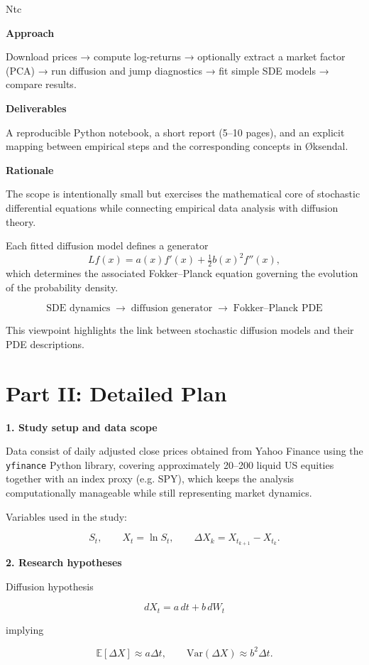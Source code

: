 Ntc\documentclass[11pt]{article}
\begin{document}
	\textbf{Approach}
	
	Download prices → compute log-returns → optionally extract a market factor (PCA) → run diffusion and jump diagnostics → fit simple SDE models → compare results.
	
	\textbf{Deliverables}
	
	A reproducible Python notebook, a short report (5–10 pages), and an explicit mapping between empirical steps and the corresponding concepts in Øksendal.
	
	\textbf{Rationale}
	
	The scope is intentionally small but exercises the mathematical core of stochastic differential equations while connecting empirical data analysis with diffusion theory.
	
	Each fitted diffusion model defines a generator
	\[
	L f(x)=a(x)f'(x)+\tfrac12 b(x)^2 f''(x),
	\]
	which determines the associated Fokker–Planck equation governing the evolution of the probability density.
	
	\[
	\text{SDE dynamics}
	\;\longrightarrow\;
	\text{diffusion generator}
	\;\longrightarrow\;
	\text{Fokker--Planck PDE}
	\]
	
	This viewpoint highlights the link between stochastic diffusion models and their PDE descriptions.
	
	\newpage
	
	\section*{Part II: Detailed Plan}
	
	\textbf{1. Study setup and data scope}
	
	Data consist of daily adjusted close prices obtained from Yahoo Finance using the \texttt{yfinance} Python library, covering approximately 20–200 liquid US equities together with an index proxy (e.g. SPY), which keeps the analysis computationally manageable while still representing market dynamics.
	
	Variables used in the study:
	
	\[
	S_t,\qquad X_t=\ln S_t,\qquad \Delta X_k=X_{t_{k+1}}-X_{t_k}.
	\]
	
	\textbf{2. Research hypotheses}
	
	Diffusion hypothesis
	
	\[
	dX_t=a\,dt+b\,dW_t
	\]
	
	implying
	
	\[
	\mathbb{E}[\Delta X]\approx a\Delta t,
	\qquad
	\mathrm{Var}(\Delta X)\approx b^2\Delta t.
	\]
	
\end{document}

